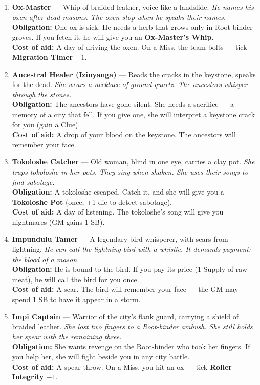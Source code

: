 \begin{enumerate}
\item \textbf{Ox-Master} --- Whip of braided leather, voice like a landslide.
  \hfill \textit{He names his oxen after dead masons. The oxen stop when he speaks their names.} \\
  \textbf{Obligation:} One ox is sick. He needs a herb that grows only in Root-binder groves. If you fetch it, he will give you an \textbf{Ox-Master's Whip}. \\
  \textbf{Cost of aid:} A day of driving the oxen. On a Miss, the team bolts --- tick \textbf{Migration Timer $-1$}.

\item \textbf{Ancestral Healer (Izinyanga)} --- Reads the cracks in the keystone, speaks for the dead.
  \hfill \textit{She wears a necklace of ground quartz. The ancestors whisper through the stones.} \\
  \textbf{Obligation:} The ancestors have gone silent. She needs a sacrifice --- a memory of a city that fell. If you give one, she will interpret a keystone crack for you (gain a Clue). \\
  \textbf{Cost of aid:} A drop of your blood on the keystone. The ancestors will remember your face.

\item \textbf{Tokoloshe Catcher} --- Old woman, blind in one eye, carries a clay pot.
  \hfill \textit{She traps tokoloshe in her pots. They sing when shaken. She uses their songs to find sabotage.} \\
  \textbf{Obligation:} A tokoloshe escaped. Catch it, and she will give you a \textbf{Tokoloshe Pot} (once, +1 die to detect sabotage). \\
  \textbf{Cost of aid:} A day of listening. The tokoloshe's song will give you nightmares (GM gains 1 SB).

\item \textbf{Impundulu Tamer} --- A legendary bird-whisperer, with scars from lightning.
  \hfill \textit{He can call the lightning bird with a whistle. It demands payment: the blood of a mason.} \\
  \textbf{Obligation:} He is bound to the bird. If you pay its price (1 Supply of raw meat), he will call the bird for you once. \\
  \textbf{Cost of aid:} A scar. The bird will remember your face --- the GM may spend 1 SB to have it appear in a storm.

\item \textbf{Impi Captain} --- Warrior of the city's flank guard, carrying a shield of braided leather.
  \hfill \textit{She lost two fingers to a Root-binder ambush. She still holds her spear with the remaining three.} \\
  \textbf{Obligation:} She wants revenge on the Root-binder who took her fingers. If you help her, she will fight beside you in any city battle. \\
  \textbf{Cost of aid:} A spear throw. On a Miss, you hit an ox --- tick \textbf{Roller Integrity $-1$}.


\end{enumerate}

